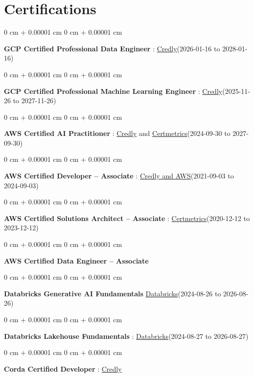 \documentclass[10pt, letterpaper]{article}
\newenvironment{onecolentry}{
    \begin{adjustwidth}{
        0 cm + 0.00001 cm
    }{
        0 cm + 0.00001 cm
    }
}{
    \end{adjustwidth}
} %
\begin{document}
    \vspace{2 pt }
    \section{Certifications}
        \vspace{2 pt }
        \begin{samepage}
            \begin{onecolentry}
                \textbf{GCP Certified Professional Data Engineer} : \href{https://www.credly.com/badges/977e96d9-12e7-4f6c-b8a7-df71fb7153b8/public_url}{Credly}(2026-01-16 to 2028-01-16)
            \end{onecolentry}
            \begin{onecolentry}
                \textbf{GCP Certified Professional Machine Learning Engineer} : \href{https://www.credly.com/badges/a6965347-09ea-4d8f-b398-0e151407160d/public_url}{Credly}(2025-11-26 to 2027-11-26)
            \end{onecolentry}
            \begin{onecolentry}
                \textbf{AWS Certified AI Practitioner} : \href{https://www.credly.com/badges/451b7ba5-8be1-4a8e-bbec-ade26627a6b6/public_url}{Credly} and \href{https://cp.certmetrics.com/amazon/en/public/verify/credential/495f0d9853874bf9a33c17f8e89ce131}{Certmetrics}(2024-09-30 to 2027-09-30)
            \end{onecolentry}
            \begin{onecolentry}
                \textbf{AWS Certified Developer – Associate} : \href{https://www.credly.com/badges/b8106fbd-d3d1-4204-8cdf-e708798fd582/public_url}{Credly and AWS}(2021-09-03  to 2024-09-03)
            \end{onecolentry}
            \begin{onecolentry}
                \textbf{AWS Certified Solutions Architect – Associate} : \href{https://cp.certmetrics.com/amazon/en/public/verify/credential/SNBY48EBJJVE1SWX}{Certmetrics}(2020-12-12 to 2023-12-12)
            \end{onecolentry}
            \begin{onecolentry}
                \textbf{AWS Certified Data Engineer – Associate}
            \end{onecolentry}
            \begin{onecolentry}
                \textbf{Databricks Generative AI Fundamentals} \href{https://sgq.io/3uIFGNi}{Databricks}(2024-08-26 to 2026-08-26)
            \end{onecolentry}
            \begin{onecolentry}
                \textbf{Databricks Lakehouse Fundamentals} : \href{https://scl.io/FXGKS0u}{Databricks}(2024-08-27 to 2026-08-27)
            \end{onecolentry}
            \begin{onecolentry}
                \textbf{Corda Certified Developer} : \href{https://www.credly.com/badges/7f29d39c-34b6-4de9-b07d-e10f1090a335/linked_in_profile}{Credly}
            \end{onecolentry}
        \end{samepage}
\end{document}
